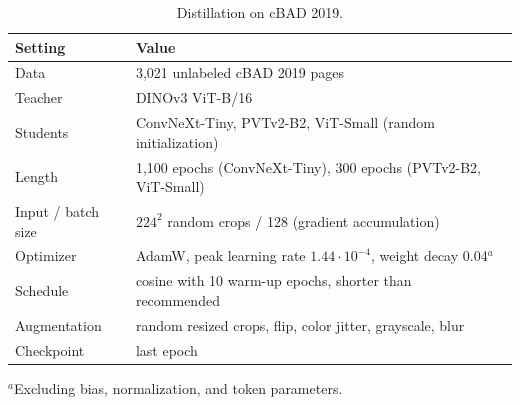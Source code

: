 \begin{table}[htbp]
    \centering
    \caption{Distillation on cBAD 2019.}
    \label{tab:distillation}
    \footnotesize
    \setlength{\tabcolsep}{4pt}
    \begin{tabular}{@{}ll@{}}
        \toprule
        Setting & Value \\
        \midrule
        Data & 3,021 unlabeled cBAD 2019 pages \\
        Teacher & DINOv3 ViT-B/16 \\
        Students & ConvNeXt-Tiny, PVTv2-B2, ViT-Small (random initialization) \\
        Length & 1,100 epochs (ConvNeXt-Tiny), 300 epochs (PVTv2-B2, ViT-Small) \\
        Input / batch size & \(224^2\) random crops / 128 (gradient accumulation) \\
        Optimizer & AdamW, peak learning rate \(1.44\cdot10^{-4}\), weight decay 0.04\(^{a}\) \\
        Schedule & cosine with 10 warm-up epochs, shorter than recommended~\cite{lightlytrain-distillation} \\
        Augmentation & random resized crops, flip, color jitter, grayscale, blur \\
        Checkpoint & last epoch \\
        \bottomrule
    \end{tabular}
    \par\smallskip
    \parbox{0.86\linewidth}{\scriptsize \(^{a}\)Excluding bias, normalization, and token parameters.}
\end{table}

